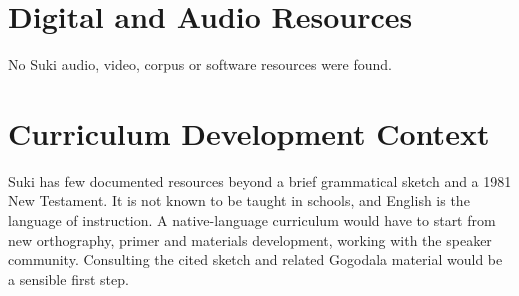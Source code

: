 \documentclass[12pt]{article}
\begin{document}
\section{Digital and Audio Resources}
No Suki audio, video, corpus or software resources were found.

\section{Curriculum Development Context}
Suki has few documented resources beyond a brief grammatical sketch and a 1981 New Testament. It is not known to be taught in schools, and English is the language of instruction. A native-language curriculum would have to start from new orthography, primer and materials development, working with the speaker community. Consulting the cited sketch and related Gogodala material would be a sensible first step.
\end{document}
